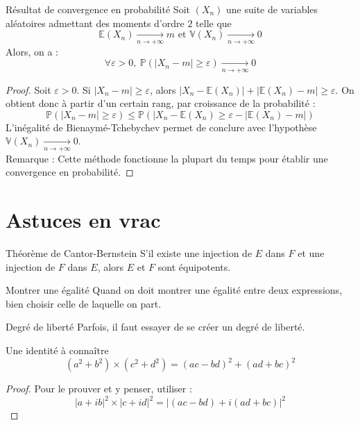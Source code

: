 \documentclass[french]{book}
\renewcommand{\P}{\mathbb{P}}
\newcommand{\E}{\mathbb{E}}
\newcommand{\V}{\mathbb{V}}
\theoremstyle{plain}
\theoremstyle{definition}
\theoremstyle{remark}
\begin{document}
\begin{AS}{Résultat de convergence en probabilité} Soit $(X_n)$ une suite de variables aléatoires admettant des moments d'ordre $2$ telle que $$\E(X_n)\xrightarrow[n\to+\infty]{}m\text{  et  }\V(X_n)\xrightarrow[n\to+\infty]{}0$$ Alors, on a : $$\forall \varepsilon>0,\ \P(\lvert X_n-m\rvert\geqslant\varepsilon)\xrightarrow[n\to+\infty]{}0$$
\end{AS}
\begin{proof}Soit $\varepsilon>0$. Si $\lvert X_n-m\rvert\geqslant\varepsilon$, alors $\lvert X_n-\E(X_n)\rvert+\lvert\E(X_n)-m\rvert\geqslant\varepsilon$. On obtient donc à partir d'un certain rang, par croissance de la probabilité : $$\P(\lvert X_n-m\rvert\geqslant\varepsilon)\leqslant\P(\lvert X_n-\E(X_n)\geqslant\varepsilon -\lvert\E(X_n)-m\rvert)$$ L'inégalité de Bienaymé-Tchebychev permet de conclure avec l'hypothèse $\V(X_n)\xrightarrow[n\to+\infty]{}0$. \\ Remarque : Cette méthode fonctionne la plupart du temps pour établir une convergence en probabilité.
\end{proof}


\chapter{Astuces en vrac}

\begin{AS}{Théorème de Cantor-Bernstein}
	S'il existe une injection de $E$ dans $F$ et une injection de $F$ dans $E$, alors $E$ et $F$ sont équipotents.
\end{AS}

\begin{AS}{Montrer une égalité} Quand on doit montrer une égalité entre deux expressions, bien choisir celle de laquelle on part.
\end{AS}

\begin{AS}{Degré de liberté} Parfois, il faut essayer de se créer un degré de liberté.
\end{AS}

\begin{AS}{Une identité à connaître} $$(a^2+b^2)\times(c^2+d^2)=(ac-bd)^2+(ad+bc)^2$$
\end{AS}

\begin{proof}
	Pour le prouver et y penser, utiliser : $$\lvert a+ib\rvert^2\times\lvert c+id\rvert^2=\lvert (ac-bd)+i(ad+bc)\rvert^2$$
\end{proof}
\end{document}
